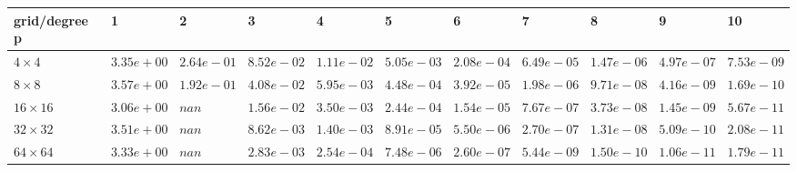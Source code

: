 \begin{tabular}{lllllllllll}
\hline
 grid/degree p   & 1          & 2          & 3          & 4          & 5          & 6          & 7          & 8          & 9          & 10         \\
\hline
 $4 \times 4$    & $3.35e+00$ & $2.64e-01$ & $8.52e-02$ & $1.11e-02$ & $5.05e-03$ & $2.08e-04$ & $6.49e-05$ & $1.47e-06$ & $4.97e-07$ & $7.53e-09$ \\
 $8 \times 8$    & $3.57e+00$ & $1.92e-01$ & $4.08e-02$ & $5.95e-03$ & $4.48e-04$ & $3.92e-05$ & $1.98e-06$ & $9.71e-08$ & $4.16e-09$ & $1.69e-10$ \\
 $16 \times 16$  & $3.06e+00$ & $nan$      & $1.56e-02$ & $3.50e-03$ & $2.44e-04$ & $1.54e-05$ & $7.67e-07$ & $3.73e-08$ & $1.45e-09$ & $5.67e-11$ \\
 $32 \times 32$  & $3.51e+00$ & $nan$      & $8.62e-03$ & $1.40e-03$ & $8.91e-05$ & $5.50e-06$ & $2.70e-07$ & $1.31e-08$ & $5.09e-10$ & $2.08e-11$ \\
 $64 \times 64$  & $3.33e+00$ & $nan$      & $2.83e-03$ & $2.54e-04$ & $7.48e-06$ & $2.60e-07$ & $5.44e-09$ & $1.50e-10$ & $1.06e-11$ & $1.79e-11$ \\
\hline
\end{tabular}